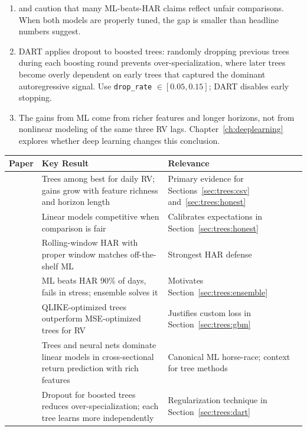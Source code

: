 \begin{enumerate}[leftmargin=1.8em]
\item \citet{BrancoRubesamZevallos2024} and \citet{HARdToBeat2024} caution
  that many ML-beats-HAR claims reflect unfair comparisons.  When both
  models are properly tuned, the gap is smaller than headline numbers
  suggest.

\item DART \citep{VinayakGilad2015} applies dropout to boosted trees:
  randomly dropping previous trees during each boosting round prevents
  over-specialization, where later trees become overly dependent on early
  trees that captured the dominant autoregressive signal.  Use
  \texttt{drop\_rate} $\in [0.05, 0.15]$; DART disables early
  stopping.

\item The gains from ML come from richer features and longer horizons, not
  from nonlinear modeling of the same three RV lags.  Chapter~\ref{ch:deeplearning}
  explores whether deep learning changes this conclusion.
\end{enumerate}

\bigskip

\begin{center}
\renewcommand{\arraystretch}{1.3}
\begin{tabular}{@{}p{4.5cm}p{6cm}p{4cm}@{}}
\toprule
\textbf{Paper} & \textbf{Key Result} & \textbf{Relevance} \\
\midrule
\citet{ChristensenSiggaardVeliyev2023}
  & Trees among best for daily RV; gains grow with feature richness and
    horizon length
  & Primary evidence for Sections~\ref{sec:trees:csv}
    and~\ref{sec:trees:honest} \\
\citet{BrancoRubesamZevallos2024}
  & Linear models competitive when comparison is fair
  & Calibrates expectations in Section~\ref{sec:trees:honest} \\
\citet{HARdToBeat2024}
  & Rolling-window HAR with proper window matches off-the-shelf ML
  & Strongest HAR defense \\
\citet{RahimikiaPoon2020}
  & ML beats HAR 90\% of days, fails in stress; ensemble solves it
  & Motivates Section~\ref{sec:trees:ensemble} \\
\citet{AudrinoKnaus2016}
  & QLIKE-optimized trees outperform MSE-optimized trees for RV
  & Justifies custom loss in Section~\ref{sec:trees:gbm} \\
\citet{GuKellyXiu2020}
  & Trees and neural nets dominate linear models in cross-sectional return
    prediction with rich features
  & Canonical ML horse-race; context for tree methods \\
\citet{VinayakGilad2015}
  & Dropout for boosted trees reduces over-specialization; each tree learns
    more independently
  & Regularization technique in Section~\ref{sec:trees:dart} \\
\bottomrule
\end{tabular}
\end{center}
